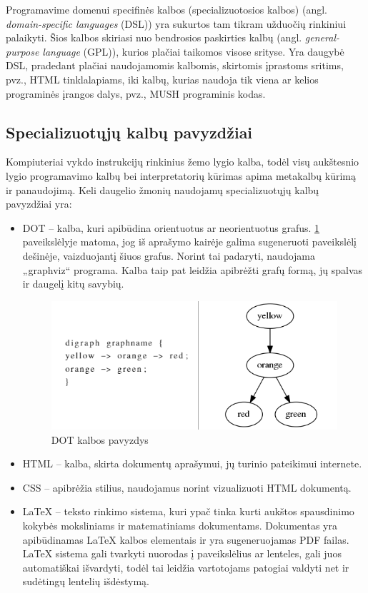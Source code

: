 \documentclass{VUMIFPSkursinis}
\begin{document}
Programavime domenui specifinės kalbos (specializuotosios kalbos) (angl.\textit{ domain-specific languages} (DSL)) yra sukurtos tam tikram užduočių rinkiniui palaikyti. Šios kalbos skiriasi nuo bendrosios paskirties kalbų (angl.\textit{ general-purpose language} (GPL)), kurios plačiai taikomos visose srityse. Yra daugybė DSL, pradedant plačiai naudojamomis kalbomis, skirtomis įprastoms sritims, pvz., HTML tinklalapiams, iki kalbų, kurias naudoja tik viena ar kelios programinės įrangos dalys, pvz., MUSH programinis kodas.

\subsection{Specializuotųjų kalbų pavyzdžiai}

Kompiuteriai vykdo instrukcijų rinkinius žemo lygio kalba, todėl visų aukštesnio lygio programavimo kalbų bei interpretatorių kūrimas apima metakalbų kūrimą ir panaudojimą. Keli daugelio žmonių naudojamų specializuotųjų kalbų pavyzdžiai yra:
\begin{itemize}
    \item DOT -- kalba, kuri apibūdina orientuotus ar neorientuotus grafus. \ref{img:dot} paveikslėlyje matoma, jog iš aprašymo kairėje galima sugeneruoti paveikslėlį dešinėje, vaizduojantį šiuos grafus. Norint tai padaryti, naudojama „graphviz“ programa. Kalba taip pat leidžia apibrėžti grafų formą, jų spalvas ir daugelį kitų savybių.
        \begin{figure}[H]
        \centering
        \includegraphics[scale=0.6]{img/Dot.png}
        \caption{DOT kalbos pavyzdys}
        \label{img:dot}
        \end{figure}
        
    \item HTML -- kalba, skirta dokumentų aprašymui, jų turinio pateikimui internete.
    \item CSS -- apibrėžia stilius, naudojamus norint vizualizuoti HTML dokumentą.
    \item LaTeX -- teksto rinkimo sistema, kuri ypač tinka kurti aukštos spausdinimo kokybės moksliniams ir matematiniams dokumentams. Dokumentas yra apibūdinamas LaTeX kalbos elementais ir yra sugeneruojamas PDF failas. LaTeX sistema gali tvarkyti nuorodas į paveikslėlius ar lenteles, gali juos automatiškai išvardyti, todėl tai leidžia vartotojams patogiai valdyti net ir sudėtingų lentelių išdėstymą.\cite{tomassetti2017complete}
\end{itemize}
\end{document}
